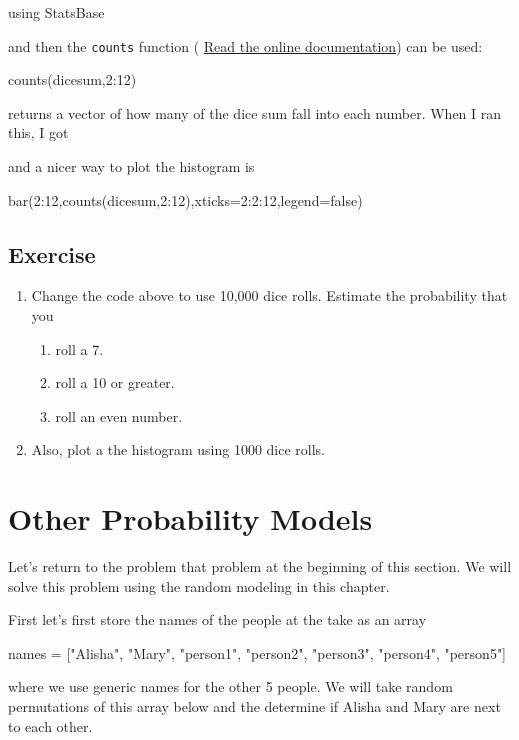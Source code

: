 \begin{jlblock}[prob]
using StatsBase
\end{jlblock}

and then the \texttt{counts} function (
\href{https://juliastats.org/StatsBase.jl/latest/counts/#StatsBase.counts}{Read
the online documentation}) can be used:

\begin{jlblock}[prob]
counts(dicesum,2:12)
\end{jlblock}
%
returns a vector of how many of the dice sum fall into each number. When I ran this, I got

\printpythontex[verbatim] 

and a nicer way to plot the histogram is
\begin{jlblock}[prob]
bar(2:12,counts(dicesum,2:12),xticks=2:2:12,legend=false)
\end{jlblock}
\begin{center}
\pgfplotsset{scale=0.7}
\end{center}

\subsection{Exercise}

\begin{enumerate}
\item Change the code above to use 10,000 dice rolls. Estimate the probability
that you

\begin{enumerate}
\item roll a 7.
\item roll a 10 or greater.
\item roll an even number.
\end{enumerate}

\item Also, plot a the histogram using 1000 dice rolls.
\end{enumerate}

\section{Other Probability Models}

Let's return to the problem that problem at the beginning of this section.  We will solve this problem using the random modeling in this chapter. 

First let's first store the names of the people at the take as an array
\begin{jlblock}[prob]
names = ["Alisha", "Mary", "person1", "person2", "person3", "person4", "person5"]
\end{jlblock}
where we use generic names for the other 5 people.  We will take random permutations of this array below and the determine if Alisha and Mary are next to each other. 


